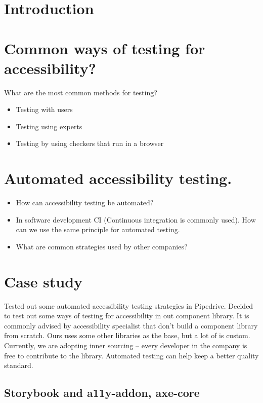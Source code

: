 \documentclass{master_thesis}
\begin{document}

\section{Introduction}


\section{Common ways of testing for accessibility?}
What are the most common methods for testing?\\
\begin{itemize}
	\item Testing with users
	\item Testing using experts
	\item Testing by using checkers that run in a browser
\end{itemize}

\section{Automated accessibility testing.}

\begin{itemize}
	\item How can accessibility testing be automated?
	\item In software development CI (Continuous integration is commonly used). How can we use the same principle for automated testing.
	\item What are common strategies used by other companies?
\end{itemize}

\section{Case study}

Tested out some automated accessibility testing strategies in Pipedrive.
Decided to test out some ways of testing for accessibility in out component library. It is commonly advised by accessibility specialist that don't build a component library from scratch. Ours uses some other libraries as the base, but a lot of is custom. Currently, we are adopting inner sourcing – every developer in the company is free to contribute to the library. Automated testing can help keep a better quality standard.

\subsection{Storybook and a11y-addon, axe-core}
\end{document}
